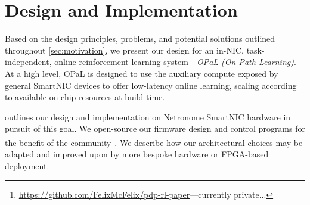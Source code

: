 \documentclass[sigconf,natbib=false]{acmart}
\newcommand{\approach}{On Path Learning}
\newcommand{\approachshort}{OPaL}
\begin{document}
\section{Design and Implementation}\label{sec:design}
Based on the design principles, problems, and potential solutions outlined throughout \cref{sec:motivation}, we present our design for an in-NIC, task-independent, online reinforcement learning system---\emph{\approachshort{} (\approach)}.
At a high level, \approachshort{} is designed to use the auxiliary compute exposed by general SmartNIC devices to offer low-latency online learning, scaling according to available on-chip resources at build time.

 outlines our design and implementation on Netronome SmartNIC hardware in pursuit of this goal.
We open-source our firmware design and control programs for the benefit of the community\footnote{\url{https://github.com/FelixMcFelix/pdp-rl-paper}---currently private...}.
We describe how our architectural choices may be adapted and improved upon by more bespoke hardware or FPGA-based deployment.
\end{document}
